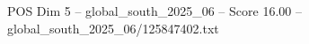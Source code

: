 \begin{textsample}{POS Dim 5 – global\_south\_2025\_06 – Score 16.00 – global\_south\_2025\_06/125847402.txt}
\end{textsample}
